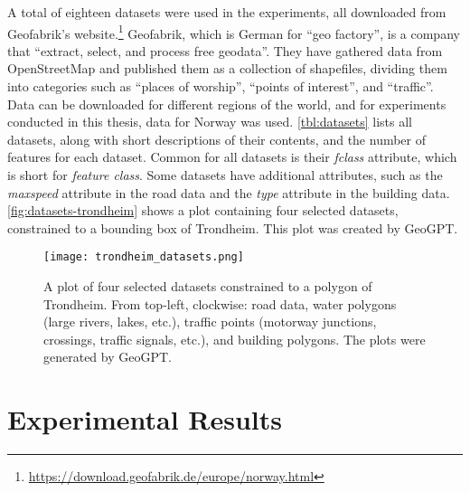 A total of eighteen datasets were used in the experiments, all downloaded from Geofabrik's website.\footnote{\url{https://download.geofabrik.de/europe/norway.html}} Geofabrik, which is German for \enquote{geo factory}, is a company that \enquote{extract, select, and process free geodata}. They have gathered data from OpenStreetMap and published them as a collection of shapefiles, dividing them into categories such as \enquote{places of worship}, \enquote{points of interest}, and \enquote{traffic}. Data can be downloaded for different regions of the world, and for experiments conducted in this thesis, data for Norway was used. \autoref{tbl:datasets} lists all datasets, along with short descriptions of their contents, and the number of features for each dataset. Common for all datasets is their \emph{fclass} attribute, which is short for \emph{feature class}. Some datasets have additional attributes, such as the \emph{maxspeed} attribute in the road data and the \emph{type} attribute in the building data. \autoref{fig:datasets-trondheim} shows a plot containing four selected datasets, constrained to a bounding box of Trondheim. This plot was created by GeoGPT.



\begin{figure}
    \centering
    \texttt{[image: trondheim\_datasets.png]}
    \caption[A plot of four selected datasets constrained to a polygon of Trondheim]{A plot of four selected datasets constrained to a polygon of Trondheim. From top-left, clockwise: road data, water polygons (large rivers, lakes, etc.), traffic points (motorway junctions, crossings, traffic signals, etc.), and building polygons. The plots were generated by GeoGPT.}
    \label{fig:datasets-trondheim}
\end{figure}

\FloatBarrier


\section{Experimental Results}
\label{sec:experimental-results}

\begin{comment}
Results should be clearly displayed and should provide a suitable representation of your results for the points you wish to make.
Graphs should be labelled in a legible font. If more than one result is displayed in the same graph, then these should be clearly marked.
Please choose carefully rather than presenting every result. Too much information is hard to read and often hides the key information you wish to present. Make use of statistical methods when presenting results, where possible to strengthen the results.
Further, the format of the presentation of results should be chosen based on what issues in the results you wish to highlight.
You may wish to present a subset in the experimental section and provide additional results in an appendix.
Point out specifics here but save the overall/general discussion to the Discussion chapter.
\end{comment}

